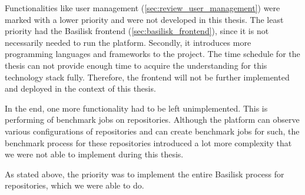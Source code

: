 Functionalities like user management (\ref{sec:review_user_management}) were marked with a lower priority and were not developed in this thesis.
The least priority had the Basilisk frontend (\ref{sec:basilisk_frontend}), since it is not necessarily needed to run the platform.
Secondly, it introduces more programming languages and frameworks to the project.
The time schedule for the thesis can not provide enough time to acquire the understanding for this technology stack fully.
Therefore, the frontend will not be further implemented and deployed in the context of this thesis.

In the end, one more functionality had to be left unimplemented.
This is performing of benchmark jobs on \gh{} repositories.
Although the platform can observe various configurations of \gh{} repositories and can create benchmark jobs for such, the benchmark process for these repositories introduced a lot more complexity that we were not able to implement during this thesis.

As stated above, the priority was to implement the entire Basilisk process for \dockh{} repositories, which we were able to do.









	